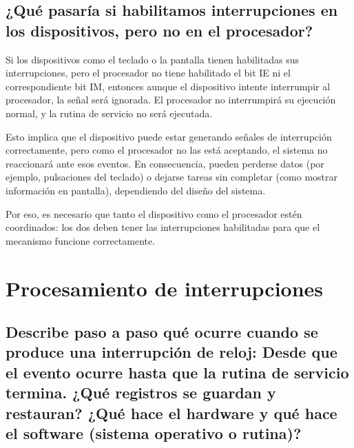 \documentclass{article}
\begin{document}
\subsection{¿Qué pasaría si habilitamos interrupciones en los dispositivos, pero no en el procesador?}

Si los dispositivos como el teclado o la pantalla tienen habilitadas sus interrupciones, pero el procesador no tiene habilitado el bit IE ni el correspondiente bit IM, entonces aunque el dispositivo intente interrumpir al procesador, la señal será ignorada. El procesador no interrumpirá su ejecución normal, y la rutina de servicio no será ejecutada.\newline

Esto implica que el dispositivo puede estar generando señales de interrupción correctamente, pero como el procesador no las está aceptando, el sistema no reaccionará ante esos eventos. En consecuencia, pueden perderse datos (por ejemplo, pulsaciones del teclado) o dejarse tareas sin completar (como mostrar información en pantalla), dependiendo del diseño del sistema.\newline

Por eso, es necesario que tanto el dispositivo como el procesador estén coordinados: los dos deben tener las interrupciones habilitadas para que el mecanismo funcione correctamente.

\section{Procesamiento de interrupciones}

\subsection{Describe paso a paso qué ocurre cuando se produce una interrupción de reloj: Desde que el evento ocurre hasta que la rutina de servicio termina. ¿Qué registros se guardan y restauran? ¿Qué hace el hardware y qué hace el software (sistema operativo o rutina)? }
\end{document}

